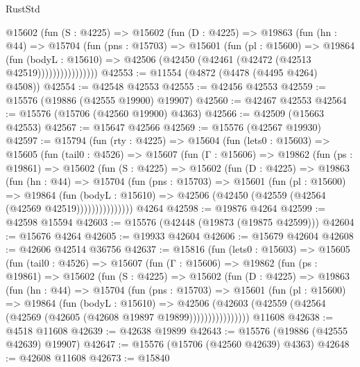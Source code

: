 \begin{lexlean}{RustStd}
\begin{coremodule}
              @15602
                (fun (S : @4225) =>
                @15602
                  (fun (D : @4225) =>
                  @19863
                    (fun (hn : @44) =>
                    @15704
                      (fun (pns : @15703) =>
                      @15601
                        (fun (pl : @15600) =>
                        @19864
                          (fun (bodyL : @15610) =>
                          @42506 (@42450 (@42461 (@42472 (@42513 @42519))))))))))))))))
@42553 := @11554 (@4872 (@4478 (@4495 @4264) @4508))
@42554 := @42548 @42553
@42555 := @42456 @42553
@42559 := @15576 (@19886 (@42555 @19900) @19907)
@42560 := @42467 @42553
@42564 := @15576 (@15706 (@42560 @19900) @4363)
@42566 := @42509 (@15663 @42553)
@42567 := @15647 @42566
@42569 := @15576 (@42567 @19930)
@42597 := @15794
    (fun (rty : @4225) =>
    @15604
      (fun (lets0 : @15603) =>
      @15605
        (fun (tail0 : @4526) =>
        @15607
          (fun (Γ : @15606) =>
          @19862
            (fun (ps : @19861) =>
            @15602
              (fun (S : @4225) =>
              @15602
                (fun (D : @4225) =>
                @19863
                  (fun (hn : @44) =>
                  @15704
                    (fun (pns : @15703) =>
                    @15601
                      (fun (pl : @15600) =>
                      @19864
                        (fun (bodyL : @15610) =>
                        @42506 (@42450 (@42559 (@42564 (@42569 @42519)))))))))))))))
    @4264
@42598 := @19876 @4264
@42599 := @42598 @15594
@42603 := @15576 (@42448 (@19873 (@19875 @42599)))
@42604 := @15676 @4264
@42605 := @19933 @42604
@42606 := @15679 @42604
@42608 := @42606 @42514 @36756
@42637 := @15816
    (fun (lets0 : @15603) =>
    @15605
      (fun (tail0 : @4526) =>
      @15607
        (fun (Γ : @15606) =>
        @19862
          (fun (ps : @19861) =>
          @15602
            (fun (S : @4225) =>
            @15602
              (fun (D : @4225) =>
              @19863
                (fun (hn : @44) =>
                @15704
                  (fun (pns : @15703) =>
                  @15601
                    (fun (pl : @15600) =>
                    @19864
                      (fun (bodyL : @15610) =>
                      @42506
                        (@42603
                          (@42559 (@42564 (@42569 (@42605 (@42608 @19897 @19899))))))))))))))))
    @11608
@42638 := @4518 @11608
@42639 := @42638 @19899
@42643 := @15576 (@19886 (@42555 @42639) @19907)
@42647 := @15576 (@15706 (@42560 @42639) @4363)
@42648 := @42608 @11608
@42673 := @15840

\end{coremodule}
\end{lexlean}
